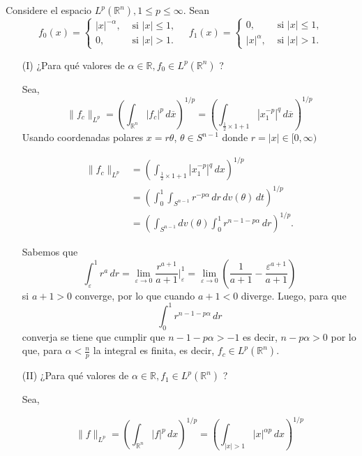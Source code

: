   Considere el espacio $L^p\left(\mathbb{R}^n\right), 1 \leq p \leq \infty$. Sean
$$
f_0(x)=\left\{\begin{array}{ll}
|x|^{-\alpha}, & \text { si }|x| \leq 1, \\
0, & \text { si }|x|>1 .
\end{array} \quad f_1(x)= \begin{cases}0, & \text { si }|x| \leq 1, \\
|x|^\alpha, & \text { si }|x|>1 .\end{cases}\right.
$$
\begin{itemize}
  \item[(I)] ¿Para qué valores de $\alpha \in \mathbb{R}, f_0 \in L^p\left(\mathbb{R}^n\right)$ ?\\
  \begin{sol}
Sea,
  \[
\| f_c \|_{L^p} = \left( \int_{\mathbb{R}^n} |f_c|^p \, d\overline{x} \right)^{1/p} = \left( \int_{\frac{1}{2} \times 1+1} |x_1^{-p}|^q \, d\overline{x} \right)^{1/p}
\]
Usando coordenadas polares \( x = r\theta \), \( \theta \in S^{n-1} \) donde \( r = |x| \in [0, \infty) \)

\begin{align*}
  \| f_c \|_{L^p} &= \left( \int_{\frac{1}{2} \times 1+1} |x_1^{-p}|^q \, dx \right)^{1/p}\\
  & = \left( \int_0^1 \int_{S^{n-1}} r^{-p\alpha} \, dr \, dv(\theta) \, dt \right)^{1/p}\\ 
  &= \left( \int_{S^{n-1}} dv(\theta) \int_0^1 r^{n-1-p\alpha} \, dr \right)^{1/p}
.\end{align*}



Sabemos que
\[
\int_\varepsilon^1 r^a \, dr = \lim_{\varepsilon \to 0} \frac{r^{a+1}}{a+1} \bigg|_\varepsilon^1 = \lim_{\varepsilon \to 0} \left( \frac{1}{a+1} - \frac{\varepsilon^{a+1}}{a+1} \right)
\]
si \( a + 1 > 0 \) converge, por lo que cuando \( a + 1 < 0 \) diverge. Luego, para que 
\[
\int_0^1 r^{n-1-p\alpha} \, dr\]
converja se tiene que cumplir que $ n-1-p\alpha > -1 $ es decir, $n - p\alpha > 0$ por lo que, para \( \alpha < \frac{n}{p} \) la integral es finita, es decir, \( f_c \in L^p(\mathbb{R}^n) \).
\end{sol}
\item[(II)] ¿Para qué valores de $\alpha \in \mathbb{R}, f_1 \in L^p\left(\mathbb{R}^n\right)$ ?\\
\begin{sol}
Sea,

\[
\| f \|_{L^p} = \left( \int_{\mathbb{R}^n} |f|^p \, dx \right)^{1/p} = \left( \int_{|x|>1} |x|^{\alpha p} \, dx \right)^{1/p}
\]


\end{sol}
\end{itemize}
